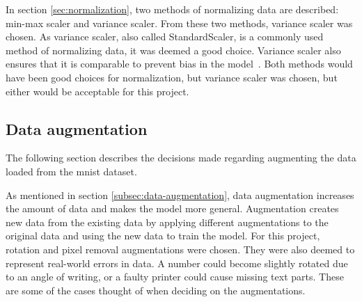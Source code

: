 In section \ref{sec:normalization}, two methods of normalizing data are described: min-max scaler and variance scaler. From these two methods, variance scaler was chosen. As variance scaler, also called StandardScaler, is a commonly used method of normalizing data, it was deemed a good choice. Variance scaler also ensures that it is comparable to prevent bias in the model~\cite{StandardScaler-towardsAi}. Both methods would have been good choices for normalization, but variance scaler was chosen, but either would be acceptable for this project.

\subsection{Data augmentation}
The following section describes the decisions made regarding augmenting the data loaded from the \gls{mnist} dataset.

As mentioned in section \ref{subsec:data-augmentation}, data augmentation increases the amount of data and makes the model more general. Augmentation creates new data from the existing data by applying different augmentations to the original data and using the new data to train the model. For this project, rotation and pixel removal augmentations were chosen. They were also deemed to represent real-world errors in data. A number could become slightly rotated due to an angle of writing, or a faulty printer could cause missing text parts. These are some of the cases thought of when deciding on the augmentations.



